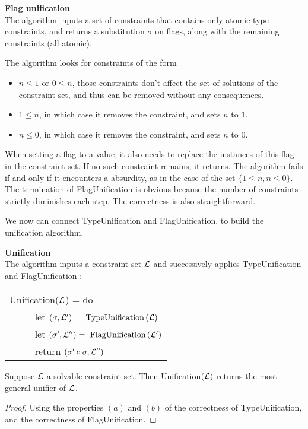 \begin{defn}{\bf Flag unification} \\
	The algorithm inputs a set of constraints that contains only atomic type constraints, and returns a substitution
	$\sigma$ on flags, along with the remaining constraints (all atomic).
	
	The algorithm looks for constraints of the form
	\begin{itemize}
		\item $n \le 1$ or $0 \le n$, those constraints don't affect the set of solutions of the constraint set, and thus can be removed
			without any consequences.
		\item $1 \le n$, in which case it removes the constraint, and sets $n$ to $1$.
		\item $n \le 0$, in which case it removes the constraint, and sets $n$ to $0$.
	\end{itemize}	
	When setting a flag to a value, it also needs to replace the instances of this flag in the constraint set.
	If no such constraint remains, it returns. The algorithm fails if and only if it encounters a absurdity,
	as in the case of the set $\{ 1 \le n, n \le 0 \}$.
	The termination of FlagUnification is obvious because the number of constraints strictly diminishes each step.
	The correctness is also straightforward.
\end{defn}

We now can connect TypeUnification and FlagUnification, to build the unification algorithm.

\begin{defn} {\bf Unification} \\
	The algorithm inputs a constraint set $\mathcal{L}$ and successively applies TypeUnification and FlagUnification :
		\begin{center}
		\begin{tabular}{l}
			Unification($\mathcal{L}$) = do \\
			~~ ~~ let $(\sigma, \mathcal{L}') = \text{ TypeUnification} \,(\mathcal{L})$ \\
			~~ ~~ let $(\sigma', \mathcal{L}'') = \text{ FlagUnification} \,(\mathcal{L}')$ \\
			~~ ~~ return $(\sigma' \circ \sigma, \mathcal{L}'')$
		\end{tabular}
		\end{center}
\end{defn}

\begin{lemma} Suppose $\mathcal{L}$ a solvable constraint set. Then Unification$(\mathcal{L})$ returns the most general unifier of $\mathcal{L}$.
	\begin{proof}
		Using the properties $(a)$ and $(b)$ of the correctness of TypeUnification, and the correctness of FlagUnification.
	\end{proof}
\end{lemma}

